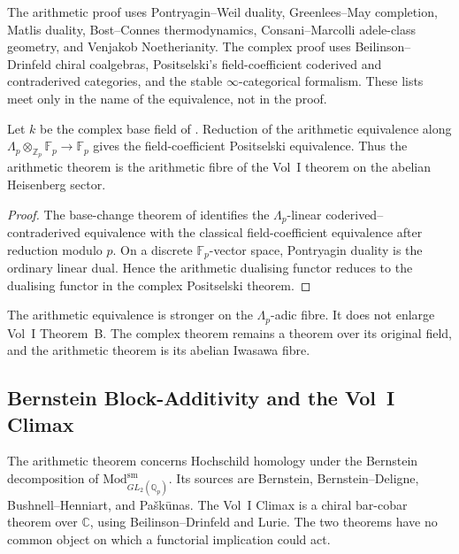 The arithmetic proof uses Pontryagin--Weil duality, Greenlees--May
completion, Matlis duality, Bost--Connes thermodynamics,
Consani--Marcolli adele-class geometry, and Venjakob
Noetherianity.  The complex proof uses Beilinson--Drinfeld chiral
coalgebras, Positselski's field-coefficient coderived and
contraderived categories, and the stable \(\infty\)-categorical
formalism.  These lists meet only in the name of the equivalence, not
in the proof.

\begin{theorem}
\label{v4-arith:w6-i:thm:W5-D-alignment}
Let \(k\) be the complex base field of
.  Reduction of
the arithmetic equivalence along
\(\Lambda_p\otimes_{\mathbb Z_p}\mathbb F_p\to\mathbb F_p\) gives the
field-coefficient Positselski equivalence.  Thus the arithmetic
theorem is the arithmetic fibre of the Vol~I theorem on the abelian
Heisenberg sector.
\end{theorem}

\begin{proof}
The base-change theorem of
 identifies the
\(\Lambda_p\)-linear coderived--contraderived equivalence with the
classical field-coefficient equivalence after reduction modulo
\(p\).  On a discrete \(\mathbb F_p\)-vector space, Pontryagin duality
is the ordinary linear dual.  Hence the arithmetic dualising functor
reduces to the dualising functor in the complex Positselski theorem.
\end{proof}

\begin{remark}
\label{v4-arith:w6-i:rem:W5-D-overextension}
The arithmetic equivalence is stronger on the
\(\Lambda_p\)-adic fibre.  It does not enlarge Vol~I Theorem~B.  The
complex theorem remains a theorem over its original field, and the
arithmetic theorem is its abelian Iwasawa fibre.
\end{remark}

\subsection{Bernstein Block-Additivity and the Vol~I Climax}
\label{v4-arith:w6-i:W5-F-alignment}

The arithmetic theorem concerns Hochschild homology under the
Bernstein decomposition of
\(\mathrm{Mod}^{\mathrm{sm}}_{GL_2(\mathbb Q_p)}\).  Its sources are
Bernstein, Bernstein--Deligne, Bushnell--Henniart, and
Pa{\v s}k{\=u}nas.  The Vol~I Climax is a chiral bar-cobar theorem
over \(\mathbb C\), using Beilinson--Drinfeld and Lurie.  The two
theorems have no common object on which a functorial implication could
act.

